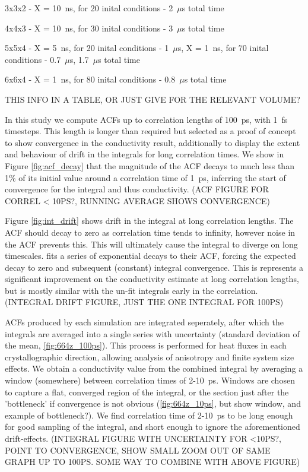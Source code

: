 \documentclass[%
preprint,                                  %
nofootinbib,
 amsmath,amssymb,
 aps,
]{revtex4-1}
\begin{document}
3x3x2 - X = 10~ns, for 20 inital conditions - 2~$\mu$s total time

4x4x3 - X = 10~ns, for 30 inital conditions - 3~$\mu$s total time

5x5x4 - X = 5~ns, for 20 inital conditions - 1~$\mu$s, X = 1~ns, for 70 inital conditions - 0.7~$\mu$s, 1.7~$\mu$s total time

6x6x4 - X = 1~ns, for 80 inital conditions - 0.8~$\mu$s total time

THIS INFO IN A TABLE, OR JUST GIVE FOR THE RELEVANT VOLUME?

In this study we compute ACFs up to correlation lengths of 100~ps, with 1~fs timesteps. This length is longer than required but selected as a proof of concept to show convergence in the conductivity result, additionally to display the extent and behaviour of drift in the integrals for long correlation times. We show in Figure \ref{fig:acf_decay} that the magnitude of the ACF decays to much less than 1\% of its initial value around a correlation time of 1~ps, inferring the start of convergence for the integral and thus conductivity. (ACF FIGURE FOR CORREL < 10PS?, RUNNING AVERAGE SHOWS CONVERGENCE) 

Figure \ref{fig:int_drift} shows drift in the integral at long correlation lengths. The ACF should decay to zero as correlation time tends to infinity, however noise in the ACF prevents this. This will ultimately cause the integral to diverge on long timescales. \citet{Howell2012} fits a series of exponential decays to their ACF, forcing the expected decay to zero and subsequent (constant) integral convergence. This is represents a significant improvement on the conductivity estimate at long correlation lengths, but is mostly similar with the un-fit integrals early in the correlation. (INTEGRAL DRIFT FIGURE, JUST THE ONE INTEGRAL FOR 100PS)

ACFs produced by each simulation are integrated seperately, after which the integrals are averaged into a single series with uncertainty (standard deviation of the mean, \ref{fig:664z_100ps}). This process is performed for heat fluxes in each crystallographic direction, allowing analysis of anisotropy and finite system size effects. We obtain a conductivity value from the combined integral by averaging a window (somewhere) between correlation times of 2-10~ps. Windows are chosen to capture a flat, converged region of the integral, or the section just after the 'bottleneck' if convergence is not obvious (\ref{fig:664z_10ps}, but show window, and example of bottleneck?). We find correlation time of 2-10~ps to be long enough for good sampling of the integral, and short enough to ignore the aforementioned drift-effects. (INTEGRAL FIGURE WITH UNCERTAINTY FOR <10PS?, POINT TO CONVERGENCE, SHOW SMALL ZOOM OUT OF SAME GRAPH UP TO 100PS. SOME WAY TO COMBINE WITH ABOVE FIGURE)
\end{document}
